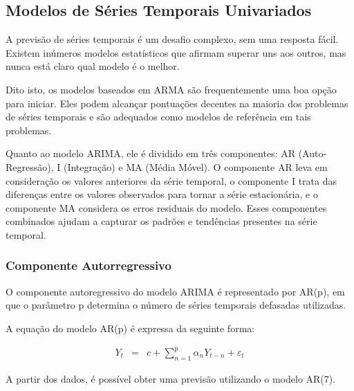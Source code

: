 \subsection{Modelos de S\'eries Temporais Univariados}\label{subsec:arima}

A previsão de séries temporais é um desafio complexo, sem uma resposta fácil. Existem inúmeros modelos estatísticos que afirmam superar uns aos outros, mas nunca está claro qual modelo é o melhor.

Dito isto, os modelos baseados em ARMA são frequentemente uma boa opção para iniciar. Eles podem alcançar pontuações decentes na maioria dos problemas de séries temporais e são adequados como modelos de referência em tais problemas.

Quanto ao modelo ARIMA, ele é dividido em três componentes: AR (Auto-Regressão), I (Integração) e MA (Média Móvel). O componente AR leva em consideração os valores anteriores da série temporal, o componente I trata das diferenças entre os valores observados para tornar a série estacionária, e o componente MA considera os erros residuais do modelo. Esses componentes combinados ajudam a capturar os padrões e tendências presentes na série temporal.

\subsubsection{Componente Autorregressivo}

O componente autoregressivo do modelo ARIMA é representado por AR(p), em que o parâmetro p determina o número de séries temporais defasadas utilizadas.

A equação do modelo AR(p) é expressa da seguinte forma:

\begin{eqnarray}
	Y_t&=&c+\sum_{n=1}^{p} \alpha_n Y_{t-n} + \varepsilon_t\label{AR}
\end{eqnarray}

A partir dos dados, é possível obter uma previsão utilizando o modelo AR(7).

